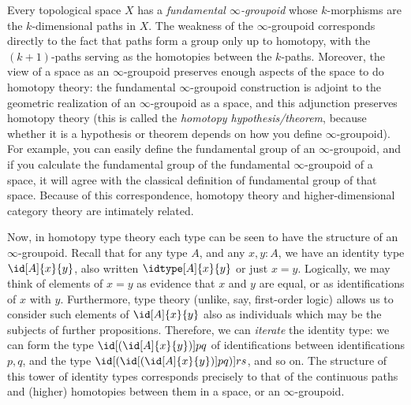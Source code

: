 Every topological space $X$ has a \emph{fundamental $\infty$-groupoid}
whose
$k$-mor\-ph\-isms are the $k$-dimen\-sional paths in $X$.  The weakness of the
$\infty$-group\-oid corresponds directly to the fact that paths form a
group only up to homotopy, with the $(k+1)$-paths serving as the
homotopies between the $k$-paths.  Moreover, the view of a space as an
$\infty$-groupoid preserves enough aspects of the space to do homotopy theory:
the fundamental $\infty$-groupoid construction is adjoint to the
geometric realization of an $\infty$-groupoid as a space, and this
adjunction preserves homotopy theory (this is called the \emph{homotopy
  hypothesis/theorem},
%
%
because whether it is a hypothesis or theorem
depends on how you define $\infty$-groupoid).  For example, you can
easily define the fundamental group of an $\infty$-groupoid, and if you
calculate the fundamental group of the fundamental $\infty$-groupoid of
a space, it will agree with the classical definition of fundamental
group of that space.  Because of this correspondence, homotopy theory
and higher-dimensional category theory are intimately related.

%
%

\mentalpause

Now, in homotopy type theory each type can be seen to have the structure
of an $\infty$-groupoid.  Recall that for any type $A$, and any $x,y:A$,
we have an identity type $\id[A]{x}{y}$, also written $\idtype[A]{x}{y}$
or just $x=y$.  Logically, we may think of elements of $x=y$ as evidence
that $x$ and $y$ are equal, or as identifications of $x$ with
$y$. Furthermore, type theory (unlike, say, first-order logic) allows us
to consider such elements of $\id[A]{x}{y}$ also as individuals which
may be the subjects of further propositions.  Therefore, we can
\emph{iterate} the identity type: we can form the type
$\id[{(\id[A]{x}{y})}]{p}{q}$ of identifications between
identifications $p,q$, and the type
$\id[{(\id[{(\id[A]{x}{y})}]{p}{q})}]{r}{s}$, and so on.  The structure
of this tower of identity types corresponds precisely to that of the
continuous paths and (higher) homotopies between them in a space, or an
$\infty$-groupoid.


